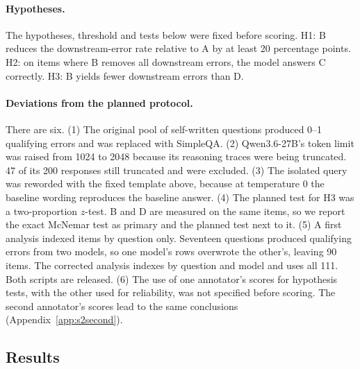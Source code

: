 \documentclass[10pt]{article}
\begin{document}
\paragraph{Hypotheses.} The hypotheses, threshold and tests below were fixed before scoring. H1: B reduces the downstream-error rate relative to A by at least 20 percentage points. H2: on items where B removes all downstream errors, the model answers C correctly. H3: B yields fewer downstream errors than D.

\paragraph{Deviations from the planned protocol.} There are six. (1) The original pool of self-written questions produced 0--1 qualifying errors and was replaced with SimpleQA. (2) Qwen3.6-27B's token limit was raised from 1024 to 2048 because its reasoning traces were being truncated. 47 of its 200 responses still truncated and were excluded. (3) The isolated query was reworded with the fixed template above, because at temperature 0 the baseline wording reproduces the baseline answer. (4) The planned test for H3 was a two-proportion $z$-test. B and D are measured on the same items, so we report the exact McNemar test as primary and the planned test next to it. (5) A first analysis indexed items by question only. Seventeen questions produced qualifying errors from two models, so one model's rows overwrote the other's, leaving 90 items. The corrected analysis indexes by question and model and uses all 111. Both scripts are released. (6) The use of one annotator's scores for hypothesis tests, with the other used for reliability, was not specified before scoring. The second annotator's scores lead to the same conclusions (Appendix~\ref{app:s2second}).

\subsection{Results}
\end{document}
